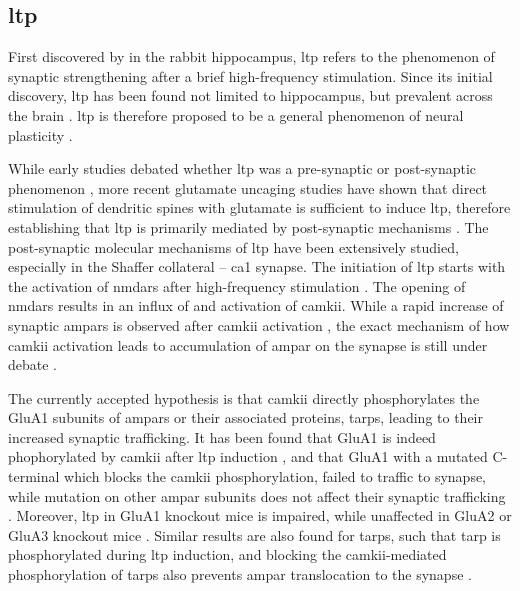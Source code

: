 \subsection{\gls{ltp}}

First discovered by \citet{bliss73} in the rabbit hippocampus, \gls{ltp} refers to the phenomenon of synaptic strengthening after a brief high-frequency stimulation. Since its initial discovery, \gls{ltp} has been found not limited to hippocampus, but prevalent across the brain \citep[e.g.][]{clugnet90}. \gls{ltp} is therefore proposed to be a general phenomenon of neural plasticity \citep{malenka04}. 

While early studies debated whether \gls{ltp} was a pre-synaptic or post-synaptic phenomenon \citep{malinow90, bekkers90, isaac95, liao95}, more recent glutamate uncaging studies have shown that direct stimulation of dendritic spines with glutamate is sufficient to induce \gls{ltp}, therefore establishing that \gls{ltp} is primarily mediated by post-synaptic mechanisms \citep{kerchner08}. The post-synaptic molecular mechanisms of \gls{ltp} have been extensively studied, especially in the Shaffer collateral -- \gls{ca1} synapse. The initiation of \gls{ltp} starts with the activation of \glspl{nmdar} after high-frequency stimulation \citep{collingridge83}. The opening of \glspl{nmdar} results in an influx of  and activation of \gls{camkii}. While a rapid increase of synaptic \glspl{ampar} is observed after \gls{camkii} activation \citep{patterson10}, the exact mechanism of how \gls{camkii} activation leads to accumulation of \gls{ampar} on the synapse is still under debate \citep{herring16}. 

The currently accepted hypothesis is that \gls{camkii} directly phosphorylates the GluA1 subunits of \glspl{ampar} or their associated proteins, \glspl{tarp}, leading to their increased synaptic trafficking. It has been found that GluA1 is indeed phophorylated by \gls{camkii} after \gls{ltp} induction \citep{mcglade-mcculloh93, barria97, lee03}, and that GluA1 with a mutated C-terminal which blocks the \gls{camkii} phosphorylation, failed to traffic to synapse, while mutation on other \gls{ampar} subunits does not affect their synaptic trafficking \citep{hayashi00, shi01}. Moreover, \gls{ltp} in GluA1 knockout mice is impaired, while unaffected in GluA2 or GluA3 knockout mice \citep{zamanillo99, meng03}. Similar results are also found for \glspl{tarp}, such that \gls{tarp} is phosphorylated during \gls{ltp} induction, and blocking the \gls{camkii}-mediated phosphorylation of \glspl{tarp} also prevents \gls{ampar} translocation to the synapse \citep{tomita05, sumioka10}.

